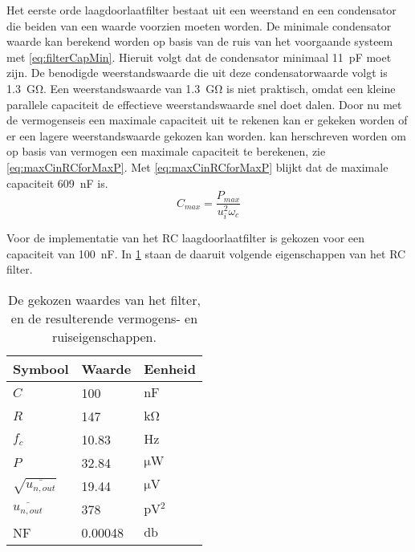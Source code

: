 Het eerste orde laagdoorlaatfilter bestaat uit een weerstand en een condensator die beiden van een waarde voorzien moeten worden. De minimale condensator waarde kan berekend worden op basis van de ruis van het voorgaande systeem met \cref{eq:filterCapMin}.
Hieruit volgt dat de condensator minimaal \qty{11}{\pico\farad} moet zijn. De benodigde weerstandswaarde die uit deze condensatorwaarde volgt is \qty{1.3}{\giga\ohm}. Een weerstandswaarde van \qtylist{1.3}{\giga\ohm} is niet praktisch, omdat een kleine parallele capaciteit de effectieve weerstandswaarde snel doet dalen. Door nu met de vermogenseis een maximale capaciteit uit te rekenen kan er gekeken worden of er een lagere weerstandswaarde gekozen kan worden.  kan herschreven worden om op basis van vermogen een maximale capaciteit te berekenen, zie \cref{eq:maxCinRCforMaxP}. Met \cref{eq:maxCinRCforMaxP} blijkt dat de maximale capaciteit \qty{609}{\nano\farad} is.
\begin{equation}\label{eq:maxCinRCforMaxP}
    C_{max}=\frac{P_{max}}{u_i^2\omega_c}
\end{equation}

Voor de implementatie van het RC laagdoorlaatfilter is gekozen voor een capaciteit van \qty{100}{\nano\farad}. In \cref{tab:filterValues} staan de daaruit volgende eigenschappen van het RC filter.

\begin{table}[!htbp]
    \centering
    \begin{tabular}{l|l|l}
        Symbool & Waarde & Eenheid \\
        \hline
        $C$         & 100    & $\si{\nano\farad}$\\
        $R$         & 147   & $\si{\kilo\ohm}$  \\
        $f_c$       & 10.83  & $\si{\hertz}$     \\
        $P$         & 32.84   & $\si{\micro\watt}$ \\
        $\sqrt{\overline{u_{n,out}}}$ & 19.44   & $\si{\micro\volt}$ \\
        $\overline{u_{n,out}}$ & 378 & $\si{\pico\volt^2}$\\
        NF          & 0.00048  & $\si{\decibel}$   \\
    \end{tabular}
    \caption{De gekozen waardes van het filter, en de resulterende vermogens- en ruiseigenschappen.}
    \label{tab:filterValues}
\end{table}


